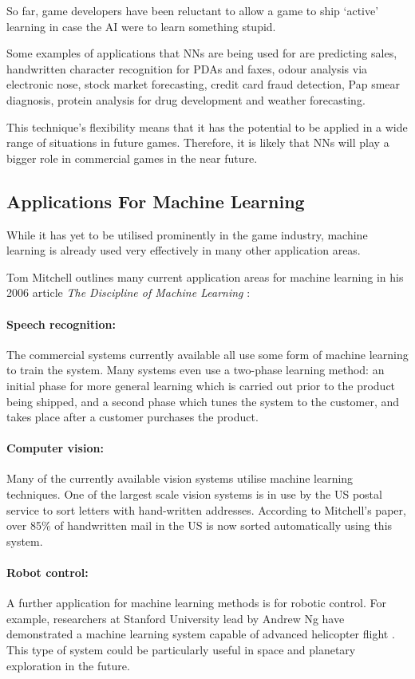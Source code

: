 \documentclass[a4paper,oneside]{report}
\begin{document}
So far, game developers have been reluctant to allow a game to ship `active' learning in case the AI were to learn something stupid.

Some examples of applications that NNs are being used for are predicting sales, handwritten character recognition for PDAs and faxes, odour analysis via electronic nose, stock market forecasting, credit card fraud detection, Pap smear diagnosis, protein analysis for drug development and weather forecasting. 

This technique’s flexibility means that it has the potential to be applied in a wide range of situations in future games. Therefore, it is likely that NNs will play a bigger role in commercial games in the near future.

\subsection{Applications For Machine Learning}

While it has yet to be utilised prominently in the game industry, machine learning is already used very effectively in many other application areas.

Tom Mitchell outlines many current application areas for machine learning in his 2006 article \emph{The Discipline of Machine Learning} \cite{Mitchell:2006fv}:

\paragraph{Speech recognition:} The commercial systems currently available all use some form of machine learning to train the system. Many systems even use a two-phase learning method: an initial phase for more general learning which is carried out prior to the product being shipped, and a second phase which tunes the system to the customer, and takes place after a customer purchases the product.

\paragraph{Computer vision:} Many of the currently available vision systems utilise machine learning techniques. One of the largest scale vision systems is in use by the US postal service to sort letters with hand-written addresses. According to Mitchell's paper, over 85\% of handwritten mail in the US is now sorted automatically using this system.

\paragraph{Robot control:} A further application for machine learning methods is for robotic control. For example, researchers at Stanford University lead by Andrew Ng have demonstrated a machine learning system capable of advanced helicopter flight \cite{Ng:2004dz, Abbeel07anapplication, Abbeel:fu}. This type of system could be particularly useful in space and planetary exploration in the future.
\end{document}
